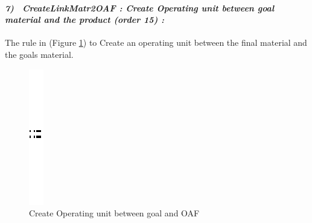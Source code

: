 \paragraph{\emph{7)~ CreateLinkMatr2OAF : Create Operating unit between goal material and the product (order 15) :} }
 
 
The rule in (Figure \ref{fig:Create Operating unit between  goal and OAF}) 
to Create an operating unit  between the final material and the goals material.
  
\vspace{1cm}
\begin{figure}[th]
\centering 
	\quad{}
		\includegraphics{ch3/img/sep}
	\quad{}
\caption{\label{fig:Create Operating unit between  goal and OAF}Create Operating unit between  goal and OAF}
 
\end{figure}
\vspace{1cm}


